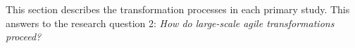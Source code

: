 This section describes the transformation processes in each primary
study. This answers to the research question 2: \textit{How do
large-scale agile transformations proceed?}
